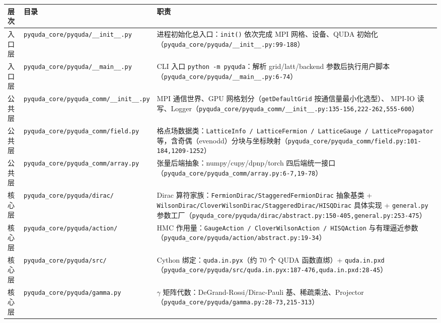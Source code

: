 \documentclass[UTF8]{ctexart}
\begin{document}
\begin{xltabular}{\textwidth}{llX}
\toprule
\textcolor{struct}{层次} & 目录 & \textcolor{struct}{职责} \\
\midrule
\endhead
入口层 & \texttt{\nolinkurl{pyquda_core/pyquda/__init__.py}} &
进程初始化总入口：\texttt{init()} 依次完成 MPI 网格、设备、QUDA 初始化
（\texttt{\nolinkurl{pyquda_core/pyquda/__init__.py:99-188}}）\\
入口层 & \texttt{\nolinkurl{pyquda_core/pyquda/__main__.py}} &
CLI 入口 \texttt{python -m pyquda}：解析 grid/latt/backend 参数后执行用户脚本
（\texttt{\nolinkurl{pyquda_core/pyquda/__main__.py:6-74}}）\\
公共层 & \texttt{\nolinkurl{pyquda_core/pyquda_comm/__init__.py}} &
MPI 通信世界、GPU 网格划分（\texttt{getDefaultGrid} 按通信量最小化选型）、
MPI-IO 读写、Logger（\texttt{\nolinkurl{pyquda_core/pyquda_comm/__init__.py:135-156,222-262,555-600}}）\\
公共层 & \texttt{\nolinkurl{pyquda_core/pyquda_comm/field.py}} &
格点场数据类：\texttt{LatticeInfo / LatticeFermion / LatticeGauge / LatticePropagator}
等，含奇偶（evenodd）分块与坐标映射（\texttt{\nolinkurl{pyquda_core/pyquda_comm/field.py:101-184,1209-1252}}）\\
公共层 & \texttt{\nolinkurl{pyquda_core/pyquda_comm/array.py}} &
张量后端抽象：numpy/cupy/dpnp/torch 四后端统一接口
（\texttt{\nolinkurl{pyquda_core/pyquda_comm/array.py:6-7,19-78}}）\\
核心层 & \texttt{\nolinkurl{pyquda_core/pyquda/dirac/}} &
Dirac 算符家族：\texttt{\nolinkurl{FermionDirac/StaggeredFermionDirac}} 抽象基类 +
\texttt{\nolinkurl{WilsonDirac/CloverWilsonDirac/StaggeredDirac/HISQDirac}} 具体实现 +
\texttt{general.py} 参数工厂（\texttt{\nolinkurl{pyquda_core/pyquda/dirac/abstract.py:150-405,general.py:253-475}}）\\
核心层 & \texttt{\nolinkurl{pyquda_core/pyquda/action/}} &
HMC 作用量：\texttt{GaugeAction / CloverWilsonAction / HISQAction} 与有理逼近参数
（\texttt{\nolinkurl{pyquda_core/pyquda/action/abstract.py:19-34}}）\\
核心层 & \texttt{\nolinkurl{pyquda_core/pyquda/src/}} &
Cython 绑定：\texttt{quda.in.pyx}（约 70 个 QUDA 函数直绑）+ \texttt{quda.in.pxd}
（\texttt{\nolinkurl{pyquda_core/pyquda/src/quda.in.pyx:187-476,quda.in.pxd:28-45}}）\\
核心层 & \texttt{\nolinkurl{pyquda_core/pyquda/gamma.py}} &
$\gamma$ 矩阵代数：DeGrand-Rossi/Dirac-Pauli 基、稀疏乘法、Projector
（\texttt{\nolinkurl{pyquda_core/pyquda/gamma.py:28-73,215-313}}）\\

\end{xltabular}
\end{document}
